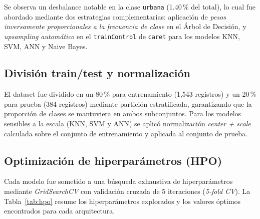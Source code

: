 \documentclass[12pt, letterpaper]{article}
\begin{document}
Se observa un desbalance notable en la clase \texttt{urbana} (1.40\,\% del total), lo cual
fue abordado mediante dos estrategias complementarias: aplicaci\'on de \textit{pesos
inversamente proporcionales a la frecuencia de clase} en el \'Arbol de Decisi\'on, y
\textit{upsampling autom\'atico} en el \texttt{trainControl} de \texttt{caret} para los
modelos KNN, SVM, ANN y Naive Bayes.

\subsection*{Divisi\'on train/test y normalizaci\'on}

El dataset fue dividido en un 80\,\% para entrenamiento (1{,}543 registros) y un 20\,\%
para prueba (384 registros) mediante partici\'on estratificada, garantizando que la
proporci\'on de clases se mantuviera en ambos subconjuntos. Para los modelos sensibles a
la escala (KNN, SVM y ANN) se aplic\'o normalizaci\'on \textit{center + scale} calculada
sobre el conjunto de entrenamiento y aplicada al conjunto de prueba.

\subsection*{Optimizaci\'on de hiperpar\'ametros (HPO)}

Cada modelo fue sometido a una b\'usqueda exhaustiva de hiperpar\'ametros mediante
\textit{GridSearchCV} con validaci\'on cruzada de 5 iteraciones (\textit{5-fold CV}).
La Tabla~\ref{tab:hpo} resume los hiperpar\'ametros explorados y los valores \'optimos
encontrados para cada arquitectura.
\end{document}
